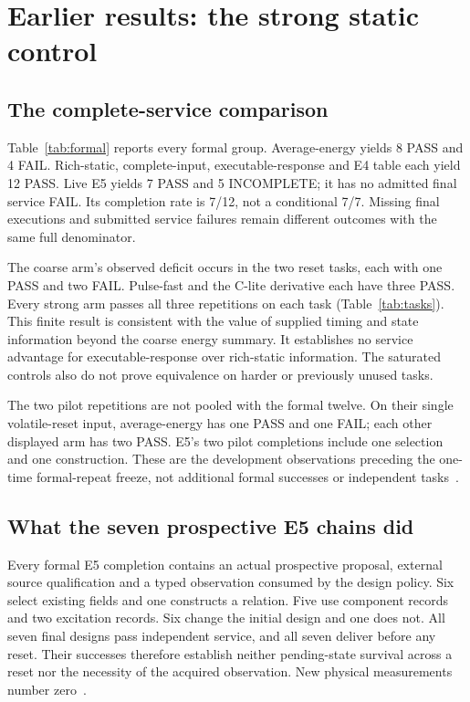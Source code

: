 \section{Earlier results: the strong static control}
\subsection{The complete-service comparison}
Table~\ref{tab:formal} reports every formal group. Average-energy yields
8 PASS and 4 FAIL. Rich-static, complete-input, executable-response and
E4 table each yield 12 PASS. Live E5 yields 7 PASS and 5 INCOMPLETE;
it has no admitted final service FAIL. Its completion rate is 7/12,
not a conditional 7/7. Missing final executions and submitted service
failures remain different outcomes with the same full denominator.




The coarse arm's observed deficit occurs in the two reset tasks, each
with one PASS and two FAIL. Pulse-fast and the C-lite derivative each
have three PASS. Every strong arm passes all three repetitions on each
task (Table~\ref{tab:tasks}). This finite result is consistent with the
value of supplied timing and state information beyond the coarse energy
summary. It establishes no service advantage for executable-response
over rich-static information. The saturated controls also do not prove
equivalence on harder or previously unused tasks.

The two pilot repetitions are not pooled with the formal twelve. On
their single volatile-reset input, average-energy has one PASS and one
FAIL; each other displayed arm has two PASS. E5's two pilot completions
include one selection and one construction. These are the development
observations preceding the one-time formal-repeat freeze, not additional
formal successes or independent tasks~\cite{tables,protocol}.

\subsection{What the seven prospective E5 chains did}
Every formal E5 completion contains an actual prospective proposal,
external source qualification and a typed observation consumed by the
design policy. Six select existing fields and one constructs a relation.
Five use component records and two excitation records. Six change the
initial design and one does not. All seven final designs pass independent
service, and all seven deliver before any reset. Their successes therefore
establish neither pending-state survival across a reset nor the necessity
of the acquired observation. New physical measurements number
zero~\cite{tables,comparison}.

